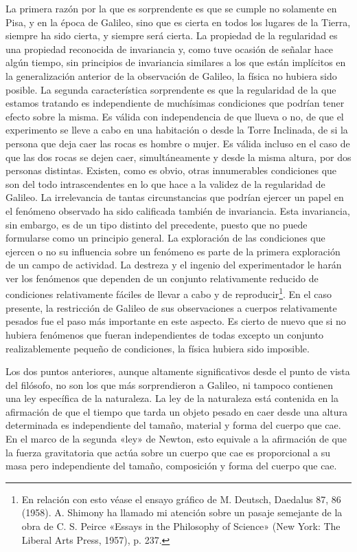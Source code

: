 \documentclass[a4paper, 12pt]{article}
\begin{document}
La primera razón por la que es sorprendente es que se cumple no solamente en Pisa, y en la época de Galileo, sino que es cierta en todos los lugares de la Tierra, siempre ha sido cierta, y siempre será cierta. La propiedad de la regularidad es una propiedad reconocida de invariancia y, como tuve ocasión de señalar hace algún tiempo, sin principios de invariancia similares a los que están implícitos en la generalización anterior de la observación de Galileo, la física no hubiera sido posible. La segunda característica sorprendente es que la regularidad de la que estamos tratando es independiente de muchísimas condiciones que podrían tener efecto sobre la misma. Es válida con independencia de que llueva o no, de que el experimento se lleve a cabo en una habitación o desde la Torre Inclinada, de si la persona que deja caer las rocas es hombre o mujer. Es válida incluso en el caso de que las dos rocas se dejen caer, simultáneamente y desde la misma altura, por dos personas distintas. Existen, como es obvio, otras innumerables condiciones que son del todo intrascendentes en lo que hace a la validez de la regularidad de Galileo. La irrelevancia de tantas circunstancias que podrían ejercer un papel en el fenómeno observado ha sido calificada también de invariancia. Esta invariancia, sin embargo, es de un tipo distinto del precedente, puesto que no puede formularse como un principio general.  La exploración de las condiciones que ejercen o no su influencia sobre un fenómeno es parte de la primera exploración de un campo de actividad. La destreza y el ingenio del experimentador le harán ver los fenómenos que dependen de un conjunto relativamente reducido de condiciones relativamente fáciles de llevar a cabo y de reproducir\footnote{En relación con esto véase el ensayo gráfico de M. Deutsch, Daedalus 87, 86 (1958). A. Shimony ha llamado mi atención sobre un pasaje semejante de la obra de C. S. Peirce «Essays in the Philosophy of Science» (New York: The Liberal Arts Press, 1957), p. 237.}. En el caso presente, la restricción de Galileo de sus observaciones a cuerpos relativamente pesados fue el paso más importante en este aspecto. Es cierto de nuevo que si no hubiera fenómenos que fueran independientes de todas excepto un conjunto realizablemente pequeño de condiciones, la física hubiera sido imposible.

Los dos puntos anteriores, aunque altamente significativos desde el punto de vista del filósofo, no son los que más sorprendieron a Galileo, ni tampoco contienen una ley específica de la naturaleza. La ley de la naturaleza está contenida en la afirmación de que el tiempo que tarda un objeto pesado en caer desde una altura determinada es independiente del tamaño, material y forma del cuerpo que cae. En el marco de la segunda «ley» de Newton, esto equivale a la afirmación de que la fuerza gravitatoria que actúa sobre un cuerpo que cae es proporcional a su masa pero independiente del tamaño, composición y forma del cuerpo que cae.
\end{document}
